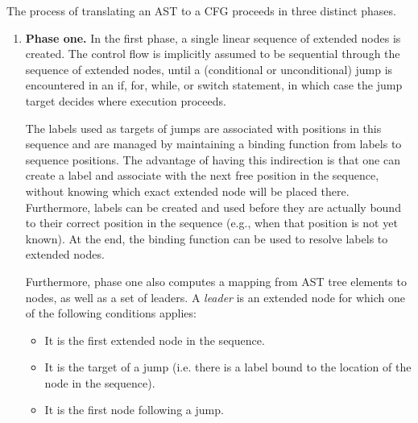 The process of translating an AST to a CFG proceeds in three distinct phases.
\begin{enumerate}
    \item \textbf{Phase one.} In the first phase, a single linear
      sequence of extended nodes is created. The control flow is
      implicitly assumed to be sequential through the sequence of
      extended nodes, until a (conditional or unconditional) jump is
      encountered in an if, for, while, or switch statement, in which
      case the jump target decides where execution proceeds.

    The labels used as targets of jumps are associated with positions
    in this sequence and are managed by maintaining a binding function
    from labels to sequence positions. The advantage of having this
    indirection is that one can create a label and associate with the
    next free position in the sequence, without knowing which exact
    extended node will be placed there.  Furthermore, labels can be
    created and used before they are actually bound to their correct
    position in the sequence (e.g., when that position is not yet
    known).  At the end, the binding function can be used to resolve
    labels to extended nodes.

    Furthermore, phase one also computes a mapping from AST tree
    elements to nodes, as well as a set of leaders. A \emph{leader} is
    an extended node for which one of the following conditions
    applies:
    \begin{itemize}
    \item It is the first extended node in the sequence.
    \item It is the target of a jump (i.e. there is a label bound to
      the location of the node in the sequence).
    \item It is the first node following a jump.
    \end{itemize}


\end{enumerate}
